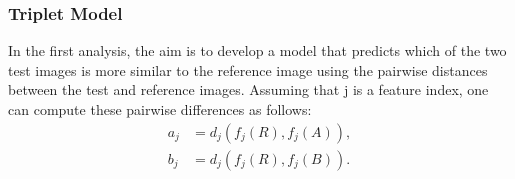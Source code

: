 


\subsubsection{Triplet Model}
In the first analysis, the aim is to develop a model that predicts which of the two test images is more similar to the reference image using the pairwise distances between the test and reference images. Assuming that j is a feature index, one can compute these pairwise differences as follows:
\begin{align}
    a_j &= d_j(f_j(R), f_j(A)), \\
   b_j &= d_j(f_j(R), f_j(B)). 
\end{align}

